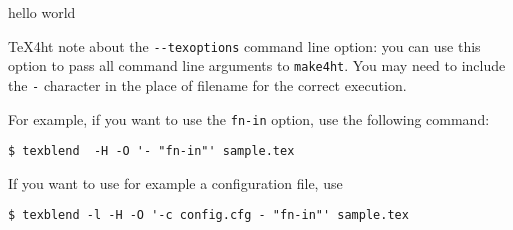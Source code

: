 
hello world

\TeX4ht note about the \verb|--texoptions| command line option: you can use
this option to pass all command line arguments to \verb|make4ht|. You may need
to include the \verb|-| character in the place of filename for the correct
execution.

For example, if you want to use the \verb|fn-in| option, use the following command:

\begin{verbatim}
$ texblend  -H -O '- "fn-in"' sample.tex
\end{verbatim}

If you want to use for example a configuration file, use

\begin{verbatim}
$ texblend -l -H -O '-c config.cfg - "fn-in"' sample.tex
\end{verbatim}
